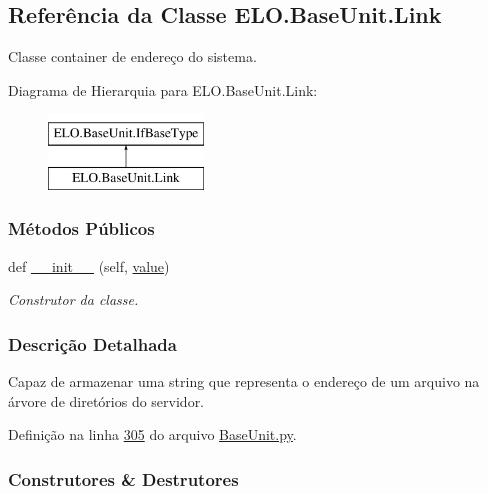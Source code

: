 \hypertarget{classELO_1_1BaseUnit_1_1Link}{}\subsection{Referência da Classe E\+L\+O.\+Base\+Unit.\+Link}
\label{classELO_1_1BaseUnit_1_1Link}


Classe container de endereço do sistema.  


Diagrama de Hierarquia para E\+L\+O.\+Base\+Unit.\+Link\+:\begin{figure}[H]
\begin{center}
\leavevmode
\includegraphics[height=2.000000cm]{d9/dbc/classELO_1_1BaseUnit_1_1Link}
\end{center}
\end{figure}
\subsubsection*{Métodos Públicos}
\begin{DoxyCompactItemize}
\item 
def \hyperlink{classELO_1_1BaseUnit_1_1Link_a5351bce524252fdd1288bea6821756db}{\+\_\+\+\_\+init\+\_\+\+\_\+} (self, \hyperlink{classELO_1_1BaseUnit_1_1IfBaseType_a2534c3548a8e5991dde0a64b4f0b542b}{value})
\begin{DoxyCompactList}\small\item\em Construtor da classe. \end{DoxyCompactList}\end{DoxyCompactItemize}


\subsubsection{Descrição Detalhada}
Capaz de armazenar uma string que representa o endereço de um arquivo na árvore de diretórios do servidor. 

Definição na linha \hyperlink{BaseUnit_8py_source_l00305}{305} do arquivo \hyperlink{BaseUnit_8py_source}{Base\+Unit.\+py}.



\subsubsection{Construtores \& Destrutores}
\hypertarget{classELO_1_1BaseUnit_1_1Link_a5351bce524252fdd1288bea6821756db}{}
